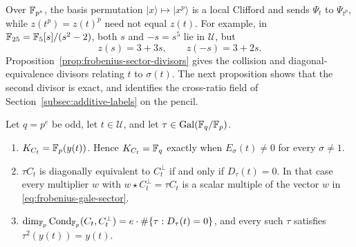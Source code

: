 Over \(\mathbb F_{p^e}\), the basis permutation
\(\lvert x\rangle\mapsto\lvert x^p\rangle\) is a local Clifford and sends
\(\Psi_t\) to \(\Psi_{t^p}\), while \(z(t^p)=z(t)^p\) need not equal
\(z(t)\).  For example, in \(\mathbb F_{25}=\mathbb F_5[s]/(s^2-2)\), both \(s\) and
\(-s=s^5\) lie in \(\mathcal U\), but
\[
 z(s)=3+3s,\qquad z(-s)=3+2s.
\]
Proposition~\ref{prop:frobenius-sector-divisors} gives the collision and
diagonal-equivalence divisors relating \(t\) to \(\sigma(t)\).  The next
proposition shows that the second divisor is exact, and identifies the
cross-ratio field of Section~\ref{subsec:additive-labels} on the pencil.

\begin{proposition}
\label{prop:pencil-hermitian-gale}
Let \(q=p^e\) be odd, let \(t\in\mathcal U\), and let
\(\tau\in\mathrm{Gal}(\mathbb F_q/\mathbb F_p)\).
\begin{enumerate}
\item \(K_{C_t}=\mathbb F_p(y(t))\).  Hence \(K_{C_t}=\mathbb F_q\) exactly when
  \(E_\sigma(t)\ne0\) for every \(\sigma\ne1\).
\item \(\tau C_t\) is diagonally equivalent to \(C_t^\perp\) if and only if
  \(D_\tau(t)=0\).  In that case every multiplier \(w\) with
  \(w\star C_t^\perp=\tau C_t\) is a scalar multiple of the vector \(w\) in
  \eqref{eq:frobenius-gale-sector}.
\item \(\dim_{\mathbb F_p}\operatorname{Cond}_{\mathbb F_p}(C_t,C_t^\perp)
  =e\cdot\#\{\tau:D_\tau(t)=0\}\), and every such \(\tau\) satisfies
  \(\tau^2(y(t))=y(t)\).
\end{enumerate}
\end{proposition}

